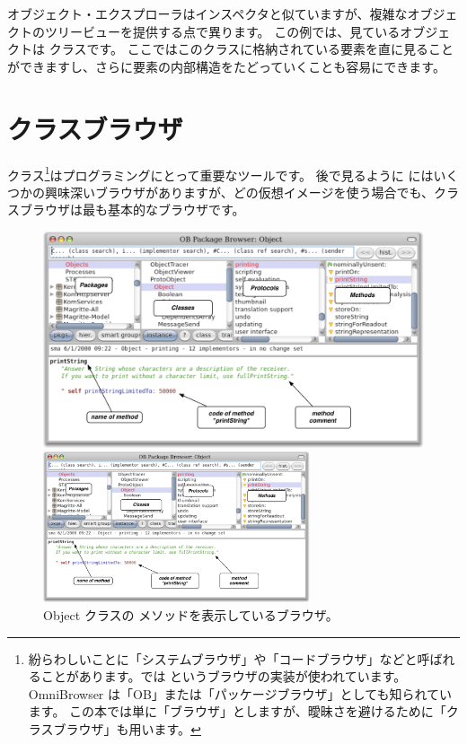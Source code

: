 \documentclass[a4paper,10pt,twoside]{book}
\begin{document}
オブジェクト・エクスプローラはインスペクタと似ていますが、複雑なオブジェクトのツリービューを提供する点で異ります。
この例では、見ているオブジェクトは  クラスです。
ここではこのクラスに格納されている要素を直に見ることができますし、さらに要素の内部構造をたどっていくことも容易にできます。

\section{クラスブラウザ}

クラス\footnote{紛らわしいことに「システムブラウザ」や「コードブラウザ」などと呼ばれることがあります。\pharo では  というブラウザの実装が使われています。OmniBrowser は「OB」または「パッケージブラウザ」としても知られています。
この本では単に「ブラウザ」としますが、曖昧さを避けるために「クラスブラウザ」も用います。}はプログラミングにとって重要なツールです。
後で見るように \pharo にはいくつかの興味深いブラウザがありますが、どの仮想イメージを使う場合でも、クラスブラウザは最も基本的なブラウザです。


\begin{figure}[htb]
\ifluluelse
	{\centerline {\includegraphics[width=\textwidth]{ClassBrowser1}}}
	{\centerline {\includegraphics[width=0.7\textwidth]{ClassBrowser1}}}
\caption{Object クラスの  メソッドを表示しているブラウザ。
}
\end{figure}
\end{document}

